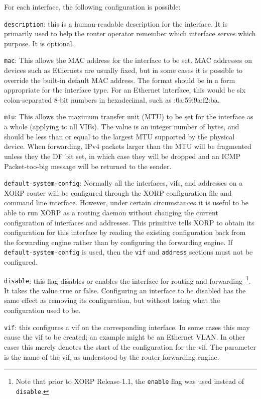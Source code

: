 \begin{description}
  For each interface, the following configuration is possible:
\begin{description}
\item{\tt description}: this is a human-readable description for the
  interface.  It is primarily used to help the router operator
  remember which interface serves which purpose.  It is optional.
\item{\tt mac}: This allows the MAC address for the interface to be
  set.  MAC addresses on devices such as Ethernets are usually fixed,
  but in some cases it is possible to override the built-in default
  MAC address.  The format should be in a form appropriate for the
  interface type.  For an Ethernet interface, this would be six
  colon-separated 8-bit numbers in hexadecimal, such as
  {:0a:59:9a:f2:ba}.
\item{\tt mtu}: This allows the maximum transfer unit (MTU) to be set
  for the interface as a whole (applying to all VIFs).  The value is
  an integer number of bytes, and should be less than or equal to the
  largest MTU supported by the physical device. When forwarding, IPv4
  packets larger than the MTU will be fragmented unless they the DF
  bit set, in which case they will be dropped and an ICMP
  Packet-too-big message will be returned to the sender.
\item{\tt default-system-config}: Normally all the interfaces, vifs,
  and addresses on a XORP router will be configured through the XORP
  configuration file and command line interface.  However, under
  certain circumstances it is useful to be able to run XORP as a
  routing daemon without changing the current configuration of
  interfaces and addresses.  This primitive tells XORP to obtain its
  configuration for this interface by reading the existing
  configuration back from the forwarding engine rather than by
  configuring the forwarding engine.
  If {\tt default-system-config} is used, then the {\tt vif} and
  {\tt address} sections must not be configured. 
\item{\tt disable}: this flag disables or enables the interface for
  routing and forwarding~\footnote{Note
  that prior to XORP Release-1.1, the {\tt enable} flag was used instead of
  {\tt disable}.}.  It takes the value {\stt true} or {\stt
  false}.  Configuring an interface to be disabled has the same effect
  as removing its configuration, but without losing what the
  configuration used to be.
\item{\tt vif}: this configures a vif on the corresponding interface.
  In some cases this may cause the vif to be created; an example
  might be an Ethernet VLAN.  In other cases this merely denotes the
  start of the configuration for the vif.  The parameter is the name
  of the vif, as understood by the router forwarding engine.


\end{description}
\end{description}
